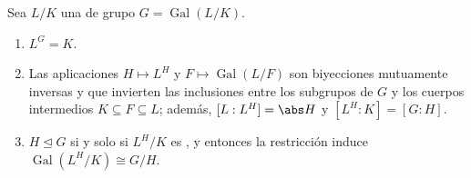 \begin{theorem}
\label{thm:b3:galois:fundamental}
Sea $L/K$ una  de
grupo $G =
\operatorname{Gal}(L/K)$.
\begin{enumerate}
  \item $L^G = K$.
  \item Las aplicaciones $H \mapsto L^H$ y $F \mapsto
        \operatorname{Gal}(L/F)$ son biyecciones mutuamente inversas y
  que invierten las inclusiones entre los subgrupos de $G$ y los cuerpos
  intermedios $K \subseteq F \subseteq L$; además, $[L : L^H] = \abs H$
  y $[L^H : K] = [G : H]$. \item $H \trianglelefteq G$ si y solo si
  $L^H/K$ es , y entonces la
  restricción induce $\operatorname{Gal}(L^H/K) \cong
        G/H$.
\end{enumerate}
\end{theorem}

